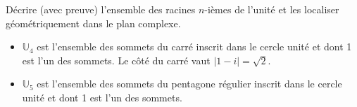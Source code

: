 \documentclass{article}
\renewenvironment{question_kholle}[2][ ]
{
	\subsection{\texorpdfstring{#2}{}}
	\notblank{#1}
	{
		\noindent #1
		\bigbreak
	}
	{}
	\begin{proof}
}
{
	\end{proof}
}
\begin{document}
\begin{question_kholle}{Décrire (avec preuve) l'ensemble des racines $n$-ièmes de l'unité et les localiser géométriquement dans le plan complexe.}
\begin{itemize}
\begin{itemize}[label=$\star$]
            \item $\mathbb U _4$ est l'ensemble des sommets du carré inscrit dans le cercle unité et dont 1 est l'un des sommets. Le côté du carré vaut $\lvert 1 - i\rvert = \sqrt 2$.
            \item $\mathbb U _5$ est l'ensemble des sommets du pentagone régulier inscrit dans le cercle unité et dont 1 est l'un des sommets.
            \begin{figure}[!h]
                \centering
            \end{figure}
        \end{itemize}
    \end{itemize}
    
\end{question_kholle}
\end{document}
